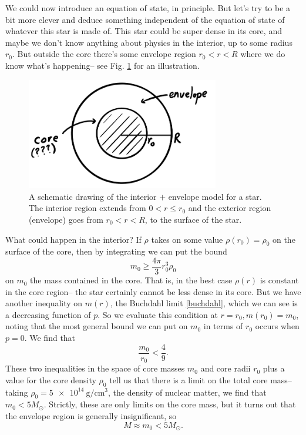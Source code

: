 We could now introduce an equation of state, in principle. But let's try to be a bit more clever and deduce something independent of the equation of state of whatever this star is made of. This star could be super dense in its core, and maybe we don't know anything about physics in the interior, up to some radius $r_0$. But outside the core there's some envelope region $r_0<r<R$ where we do know what's happening-- see Fig. \ref{fig:starcore} for an illustration.

\begin{figure}
    \centering
    \includegraphics[width=0.75\textwidth]{2019/01/20190121_starcore.png}
    \caption{A schematic drawing of the interior $+$ envelope model for a star. The interior region extends from $0<r\leq r_0$ and the exterior region (envelope) goes from $r_0 < r < R$, to the surface of the star.}
    \label{fig:starcore}
\end{figure}

What could happen in the interior? If $\rho$ takes on some value $\rho(r_0)=\rho_0$ on the surface of the core, then by integrating we can put the bound
\begin{equation}
    m_0 \geq \frac{4\pi}{3} r_0^3 \rho_0
\end{equation}
on $m_0$ the mass contained in the core. That is, in the best case $\rho(r)$ is constant in the core region-- the star certainly cannot be less dense in its core. But we have another inequality on $m(r)$, the Buchdahl limit \ref{buchdahl}, which we can see is a decreasing function of $p$. So we evaluate this condition at $r=r_0,m(r_0)=m_0$, noting that the most general bound we can put on $m_0$ in terms of $r_0$ occurs when $p=0$. We find that
\begin{equation}
    \frac{m_0}{r_0} < \frac{4}{9}.
\end{equation}
These two inequalities in the space of core masses $m_0$ and core radii $r_0$ plus a value for the core density $\rho_0$ tell us that there is a limit on the total core mass-- taking $\rho_0= \SI{5e14}{\gram/\centi\meter^3}$, the density of nuclear matter, we find that $m_0<5 M_\odot$. Strictly, these are only limits on the core mass, but it turns out that the envelope region is generally insignificant, so
\begin{equation}
    M\approx m_0 < 5 M_\odot.
\end{equation}